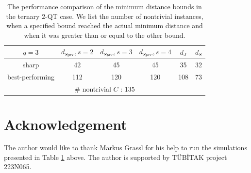 \documentclass[11pt]{amsart}
\renewcommand{\arraystretch}{1.1}
\theoremstyle{plain}
\theoremstyle{definition}
\numberwithin{equation}{section}
\begin{document}
\begin{table}[ht!]
\renewcommand{\arraystretch}{1.2}
\caption{The performance comparison of the minimum distance bounds in the ternary $2$-QT case. We list the number of nontrivial instances, when a specified bound reached the actual minimum distance and when it was greater than or equal to the other bound.}
\centering
\begin{tabular}{c|c|c|c|c|c}
	\hline
	$q=3$ &  $d_{Spec}, s=2$ &  $d_{Spec}, s=3$ &  $d_{Spec}, s=4$ & $d_J$ & $d_{S}$    \\
	\hline
	sharp & 42 & 45 & 45 & 35 & 32  \\
	best-performing & 112 & 120 & 120 & 108 & 73 \\
	\hline
	  \multicolumn{6}{c}{ \# nontrivial $C$ : 135}  \\
	\hline
\end{tabular}
\label{table:simulation}
\end{table}

%
\section*{Acknowledgement}
The author would like to thank Markus Grassl for his help to run the simulations presented in Table \ref{table:simulation} above. The author is supported by T\"UB{\.I}TAK project 223N065.
\end{document}
